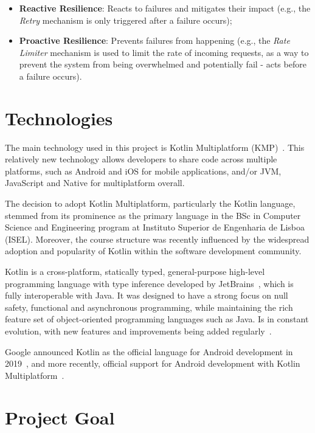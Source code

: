\begin{itemize}
    \item \textbf{Reactive Resilience}: Reacts to failures and mitigates their impact (e.g., the \textit{Retry} mechanism is only triggered after a failure occurs);
    \item \textbf{Proactive Resilience}: Prevents failures from happening (e.g., the \textit{Rate Limiter} mechanism is used to limit the rate of incoming requests, as a way to prevent the system from being overwhelmed and potentially fail - acts before a failure occurs).
\end{itemize}


\section{Technologies}\label{sec:technologies}

The main technology used in this project is Kotlin Multiplatform (KMP)~\cite{kotlin-multiplatform}.
This relatively new technology allows developers to share code across multiple platforms, such as Android and iOS for mobile applications, and/or JVM, JavaScript and Native for multiplatform overall.

The decision to adopt Kotlin Multiplatform, particularly the Kotlin language, stemmed from its prominence as the primary language in the BSc in Computer Science and Engineering program at Instituto Superior de Engenharia de Lisboa (ISEL). Moreover, the course structure was recently influenced by the widespread adoption and popularity of Kotlin within the software development community.

Kotlin is a cross-platform, statically typed, general-purpose high-level programming language with type inference developed by JetBrains~\cite{jetbrains}, which is fully interoperable with Java.
It was designed to have a strong focus on null safety, functional and asynchronous programming, while maintaining the rich feature set of object-oriented programming languages such as Java.
Is in constant evolution, with new features and improvements being added regularly~\cite{kotlin-keep}.

Google announced Kotlin as the official language for Android development in 2019~\cite{google-android-kotlin}, and more recently, official support for Android development with Kotlin Multiplatform~\cite{android-kotlin-multiplatform, google-kotlin-multiplatform}.


\section{Project Goal}\label{sec:project-goal}

